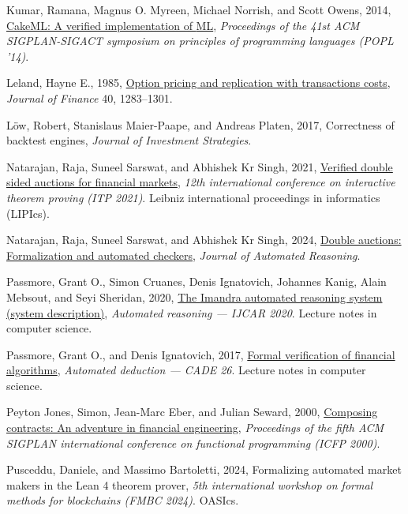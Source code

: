 \documentclass[
  11pt,
  letterpaper,
  DIV=12,
  numbers=noendperiod]{scrartcl}
\newlength{\cslhangindent}
\newenvironment{CSLReferences}[2] %
 {\begin{list}{}{%
  \setlength{\itemindent}{0pt}
  \setlength{\leftmargin}{0pt}
  \setlength{\parsep}{0pt}
  \ifodd #1
   \setlength{\leftmargin}{\cslhangindent}
   \setlength{\itemindent}{-1\cslhangindent}
  \fi
  \setlength{\itemsep}{#2\baselineskip}}}
 {\end{list}}
\numberwithin{equation}{section}
\numberwithin{figure}{section}
\numberwithin{table}{section}
\begin{document}
\begin{CSLReferences}{0}{1}
Kumar, Ramana, Magnus O. Myreen, Michael Norrish, and Scott Owens, 2014,
\href{https://doi.org/10.1145/2535838.2535841}{{CakeML}: A verified
implementation of {ML}}, \emph{Proceedings of the 41st {ACM}
{SIGPLAN}-{SIGACT} symposium on principles of programming languages
(POPL '14)}.

Leland, Hayne E., 1985,
\href{https://doi.org/10.1111/j.1540-6261.1985.tb02383.x}{Option pricing
and replication with transactions costs}, \emph{Journal of Finance} 40,
1283--1301.

Löw, Robert, Stanislaus Maier-Paape, and Andreas Platen, 2017,
Correctness of backtest engines, \emph{Journal of Investment
Strategies}.

Natarajan, Raja, Suneel Sarswat, and Abhishek Kr Singh, 2021,
\href{https://doi.org/10.4230/LIPIcs.ITP.2021.28}{Verified double sided
auctions for financial markets}, \emph{12th international conference on
interactive theorem proving ({ITP} 2021)}. Leibniz international
proceedings in informatics (LIPIcs).

Natarajan, Raja, Suneel Sarswat, and Abhishek Kr Singh, 2024,
\href{https://doi.org/10.1007/s10817-025-09732-x}{Double auctions:
Formalization and automated checkers}, \emph{Journal of Automated
Reasoning}.

Passmore, Grant O., Simon Cruanes, Denis Ignatovich, Johannes Kanig,
Alain Mebsout, and Seyi Sheridan, 2020,
\href{https://doi.org/10.1007/978-3-030-51054-1_30}{The {Imandra}
automated reasoning system (system description)}, \emph{Automated
reasoning --- {IJCAR} 2020}. Lecture notes in computer science.

Passmore, Grant O., and Denis Ignatovich, 2017,
\href{https://doi.org/10.1007/978-3-319-63046-5_3}{Formal verification
of financial algorithms}, \emph{Automated deduction --- {CADE} 26}.
Lecture notes in computer science.

Peyton Jones, Simon, Jean-Marc Eber, and Julian Seward, 2000,
\href{https://doi.org/10.1145/351240.351267}{Composing contracts: An
adventure in financial engineering}, \emph{Proceedings of the fifth {ACM
SIGPLAN} international conference on functional programming ({ICFP}
2000)}.

Pusceddu, Daniele, and Massimo Bartoletti, 2024, Formalizing automated
market makers in the {Lean} 4 theorem prover, \emph{5th international
workshop on formal methods for blockchains ({FMBC} 2024)}. OASIcs.


\end{CSLReferences}
\end{document}
